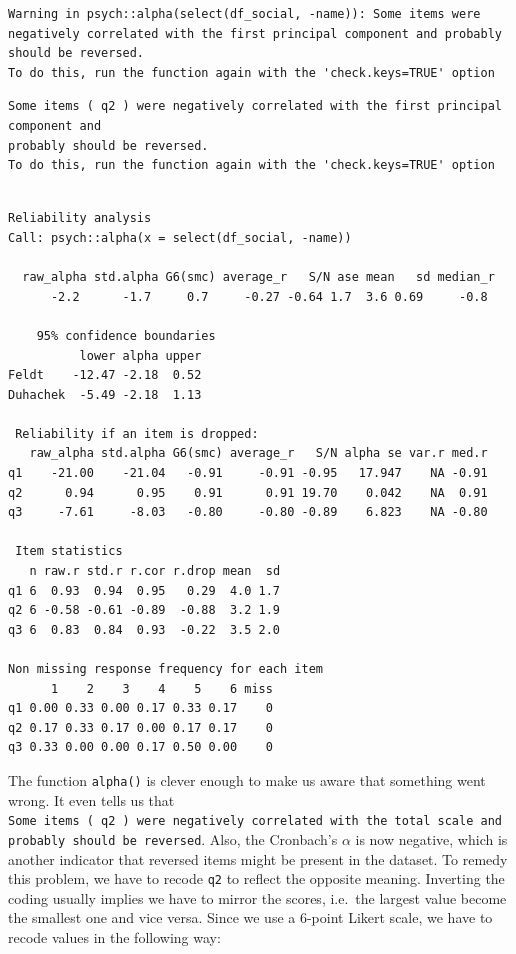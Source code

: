 \documentclass[
  letterpaper,
]{krantz}
\begin{document}
\begin{verbatim}
Warning in psych::alpha(select(df_social, -name)): Some items were negatively correlated with the first principal component and probably 
should be reversed.  
To do this, run the function again with the 'check.keys=TRUE' option
\end{verbatim}

\begin{verbatim}
Some items ( q2 ) were negatively correlated with the first principal component and 
probably should be reversed.  
To do this, run the function again with the 'check.keys=TRUE' option
\end{verbatim}

\begin{verbatim}

Reliability analysis   
Call: psych::alpha(x = select(df_social, -name))

  raw_alpha std.alpha G6(smc) average_r   S/N ase mean   sd median_r
      -2.2      -1.7     0.7     -0.27 -0.64 1.7  3.6 0.69     -0.8

    95% confidence boundaries 
          lower alpha upper
Feldt    -12.47 -2.18  0.52
Duhachek  -5.49 -2.18  1.13

 Reliability if an item is dropped:
   raw_alpha std.alpha G6(smc) average_r   S/N alpha se var.r med.r
q1    -21.00    -21.04   -0.91     -0.91 -0.95   17.947    NA -0.91
q2      0.94      0.95    0.91      0.91 19.70    0.042    NA  0.91
q3     -7.61     -8.03   -0.80     -0.80 -0.89    6.823    NA -0.80

 Item statistics 
   n raw.r std.r r.cor r.drop mean  sd
q1 6  0.93  0.94  0.95   0.29  4.0 1.7
q2 6 -0.58 -0.61 -0.89  -0.88  3.2 1.9
q3 6  0.83  0.84  0.93  -0.22  3.5 2.0

Non missing response frequency for each item
      1    2    3    4    5    6 miss
q1 0.00 0.33 0.00 0.17 0.33 0.17    0
q2 0.17 0.33 0.17 0.00 0.17 0.17    0
q3 0.33 0.00 0.00 0.17 0.50 0.00    0
\end{verbatim}

The function \texttt{alpha()} is clever enough to make us aware that
something went wrong. It even tells us that
\texttt{Some\ items\ (\ q2\ )\ were\ negatively\ correlated\ with\ the\ total\ scale\ and\ probably\ should\ be\ reversed}.
Also, the Cronbach's \(\alpha\) is now negative, which is another
indicator that reversed items might be present in the dataset. To remedy
this problem, we have to recode \texttt{q2} to reflect the opposite
meaning. Inverting the coding usually implies we have to mirror the
scores, i.e.~the largest value become the smallest one and vice versa.
Since we use a 6-point Likert scale, we have to recode values in the
following way:
\end{document}
